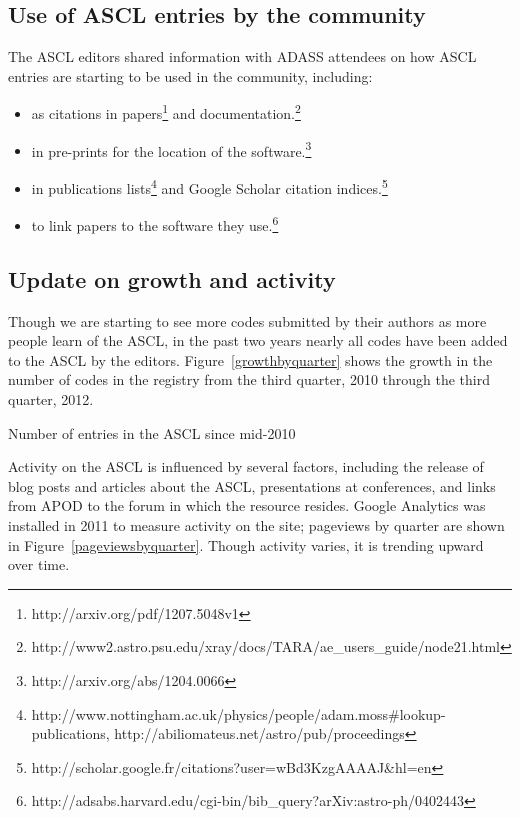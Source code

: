 \documentclass[11pt,twoside]{article}
\begin{document}
\subsection{Use of ASCL entries by the community}
The ASCL editors shared information with ADASS attendees on how ASCL entries are starting to be used in the community, including: 
\begin{itemize}

\item as citations in papers\footnote{http://arxiv.org/pdf/1207.5048v1} and documentation.\footnote{http://www2.astro.psu.edu/xray/docs/TARA/ae\_users\_guide/node21.html}

\item in pre-prints for the location of the software.\footnote{http://arxiv.org/abs/1204.0066}

\item in publications lists\footnote{http://www.nottingham.ac.uk/physics/people/adam.moss\#lookup-publications, http://abiliomateus.net/astro/pub/proceedings} and Google Scholar citation indices.\footnote{http://scholar.google.fr/citations?user=wBd3KzgAAAAJ\&hl=en}

\item to link papers to the software they use.\footnote{http://adsabs.harvard.edu/cgi-bin/bib\_query?arXiv:astro-ph/0402443}

\end{itemize}

\subsection{Update on growth and activity}
Though we are starting to see more codes submitted by their authors as more people learn of the ASCL, in the past two years nearly all codes have been added to the ASCL by the editors. Figure~\ref{growthbyquarter} shows the growth in the number of codes in the registry from the third quarter, 2010 through the third quarter, 2012.

{Number of entries in the ASCL since mid-2010}

Activity on the ASCL is influenced by several factors, including the release of blog posts and articles about the ASCL, presentations at conferences, and links from APOD to the forum in which the resource resides. Google Analytics was installed in 2011 to measure activity on the site; pageviews by quarter are shown in Figure~\ref{pageviewsbyquarter}. Though activity varies, it is trending upward over time. 
\end{document}
